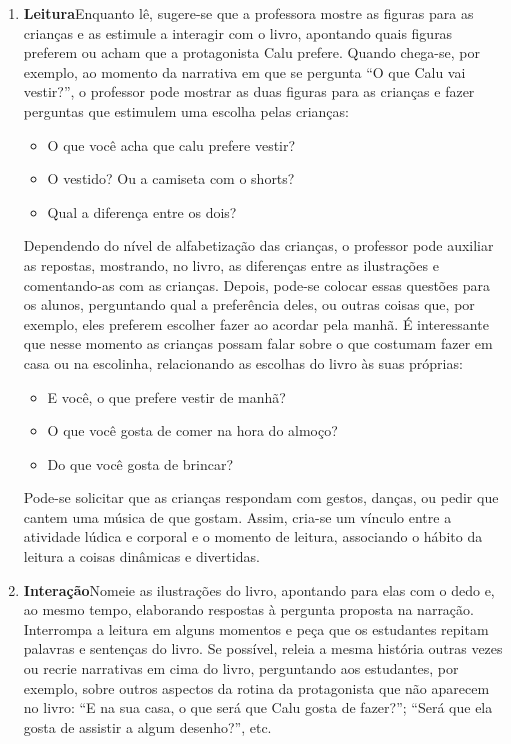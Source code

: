 \documentclass[11pt]{extarticle}
\begin{document}
\begin{enumerate}
\item \textbf{Leitura}\quad Enquanto lê, sugere-se que a professora mostre as figuras para as crianças e as estimule a interagir com o livro, apontando quais figuras preferem ou acham que a protagonista Calu prefere. Quando chega-se, por exemplo, ao momento da narrativa em que se pergunta ``O que Calu vai vestir?'', o professor pode mostrar as duas figuras para as crianças e fazer perguntas que estimulem uma escolha pelas crianças:

\begin{itemize}
\item O que você acha que calu prefere vestir?
\item O vestido? Ou a camiseta com o shorts?
\item Qual a diferença entre os dois?
\end{itemize}

Dependendo do nível de alfabetização das crianças, o professor pode auxiliar as repostas, mostrando, no livro, as diferenças entre as ilustrações e comentando-as com as crianças.
Depois, pode-se colocar essas questões para os alunos, perguntando qual a preferência deles, ou outras coisas que, por exemplo, eles preferem escolher fazer ao acordar pela manhã.
É interessante que nesse momento as crianças possam falar sobre o que costumam fazer em casa ou na escolinha, relacionando as escolhas do livro às suas próprias:

\begin{itemize}
\item E você, o que prefere vestir de manhã?
\item O que você gosta de comer na hora do almoço?
\item Do que você gosta de brincar?
\end{itemize}

Pode-se solicitar que as crianças respondam com gestos, danças, ou pedir que cantem uma música de que gostam. Assim, cria-se um vínculo entre a atividade lúdica e corporal e o momento de leitura, associando o hábito da leitura a coisas dinâmicas e divertidas.

\item \textbf{Interação}\quad Nomeie as ilustrações 
do livro, apontando para elas com o dedo e, ao mesmo tempo, elaborando respostas à pergunta proposta na narração. Interrompa a leitura em alguns momentos e peça que 
os estudantes repitam palavras e sentenças do livro. Se possível, 
releia a mesma história outras vezes ou recrie narrativas em cima do livro, perguntando aos estudantes, por exemplo, sobre outros aspectos da rotina da protagonista que não aparecem no livro: ``E na sua casa, o que será que Calu gosta de fazer?''; ``Será que ela gosta de assistir a algum desenho?'', etc.
\end{enumerate}
\end{document}
